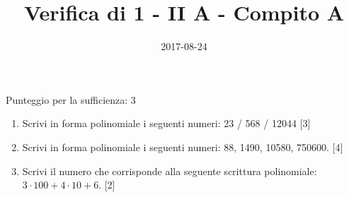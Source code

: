 \documentclass[11pt,fleqn]{article} %
\title{Verifica di 1 - II A - Compito A}
\date{2017-08-24}
\newcommand{\T}{\cdot}
\begin{document}
\maketitle
Punteggio per la sufficienza: 3
\begin{enumerate}

\item Scrivi in forma polinomiale i seguenti numeri: 23 / 568 / 12044 [3] 
\item Scrivi in forma polinomiale i seguenti numeri: 88, 1490, 10580, 750600. [4] 
\item Scrivi il numero che corrisponde alla seguente scrittura polinomiale: $3\T100 + 4\T10 + 6$. [2] 
\end{enumerate}
\end{document}
